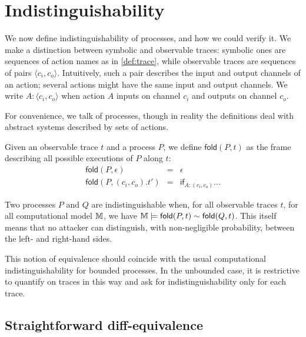 \section{Indistinguishability}
\newcommand{\pair}[1]{\langle #1 \rangle}

We now define indistinguishability of processes, and how we could verify it.
We make a distinction between symbolic and observable traces:
symbolic ones are sequences of action names as in \cref{def:trace},
while observable traces are sequences of pairs $\pair{c_i,c_o}$.
Intuitively, such a pair describes the input and output channels of an
action; several actions might have the same input and output channels.
We write $A : \pair{c_i,c_o}$ when action $A$ inputs on channel $c_i$ and
outputs on channel $c_o$.

For convenience, we talk of processes, though in reality the definitions
deal with abstract systems described by sets of actions.

\newcommand{\fold}{\mathsf{fold}}

\begin{definition}
  Given an observable trace $t$ and a process $P$,
  we define $\fold(P,t)$ as the frame describing all possible
  executions of $P$ along $t$:
  \begin{eqnarray*}
    \fold(P,\epsilon) &=& \epsilon \\
    \fold(P,(c_i,c_o).t') &=&
      \mathsf{if}_{A:(c_i,c_o)}
      \ldots
  \end{eqnarray*}
\end{definition}

\begin{definition}
  Two processes $P$ and $Q$ are indistinguishable when,
  for all observable traces $t$,
  for all computational model $\mathbb{M}$,
  we have
  $\Mo \models \fold(P,t) \sim \fold(Q,t)$.
  This itself means that no attacker can distinguish,
  with non-negligible probability, between the left- and right-hand sides.
\end{definition}

This notion of equivalence should coincide with the usual computational
indistinguishability for bounded processes. In the unbounded case, it
is restrictive to quantify on traces in this way
and ask for indistinguishability only for each trace.

\subsection{Straightforward diff-equivalence}

